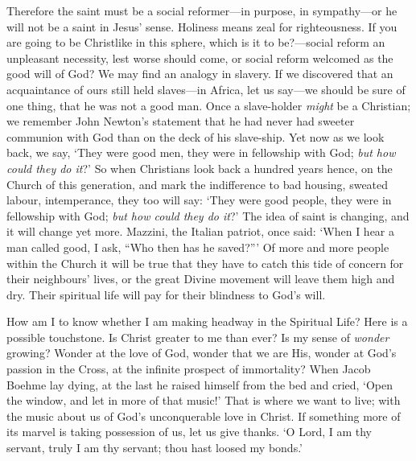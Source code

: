 \documentclass[12pt,a5paper]{article}
\begin{document}
Therefore the saint must be a social reformer---in purpose, in sympathy---or he will not be a saint in Jesus' sense. Holiness means zeal for righteousness. If you are going to be Christlike in this sphere, which is it to be?---social reform an unpleasant necessity, lest worse should come, or social reform welcomed as the good will of God? We may find an analogy in slavery. If we discovered that an acquaintance of ours still held slaves---in Africa, let us say---we should be sure of one thing, that he was not a good man. Once a slave-holder \textit{might} be a Christian; we remember John Newton's statement that he had never had sweeter communion with God than on the deck of his slave-ship. Yet now as we look back, we say, `They were good men, they were in fellowship with God; \textit{but how could they do it}?' So when Christians look back a hundred years hence, on the Church of this generation, and mark the indifference to bad housing, sweated labour, intemperance, they too will say: `They were good people, they were in fellowship with God; \textit{but how could they do it}?' The idea of saint is changing, and it will change yet more. Mazzini, the Italian patriot, once said: `When I hear a man called good, I ask, ``Who then has he saved?''' Of more and more people within the Church it will be true that they have to catch this tide of concern for their neighbours' lives, or the great Divine movement will leave them high and dry. Their spiritual life will pay for their blindness to God's will. 

How am I to know whether I am making headway in the Spiritual Life? Here is a possible touchstone. Is Christ greater to me than ever? Is my sense of \textit{wonder} growing? Wonder at the love of God, wonder that we are His, wonder at God's passion in the Cross, at the infinite prospect of immortality? When Jacob Boehme lay dying,
at the last he raised himself from the bed and cried, `Open the window, and let in more of that music!' That is where we want to live; with the music about us of God's unconquerable love in Christ. If something more of its marvel is taking possession of us, let us give thanks. `O Lord, I am thy servant, truly I am thy servant; thou hast loosed my bonds.'
\end{document}
